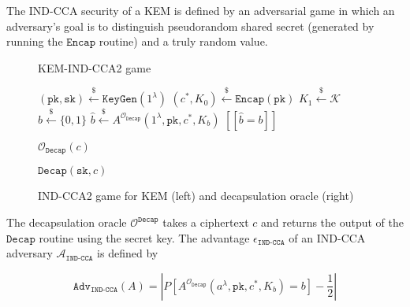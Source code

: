 \documentclass[journal=tches,submission]{iacrtrans}
\newcommand{\keygen}{\texttt{KeyGen}}
\newcommand{\encap}{\texttt{Encap}}
\newcommand{\decap}{\texttt{Decap}}
\newcommand{\pk}{\texttt{pk}}
\newcommand{\sk}{\texttt{sk}}
\newcommand{\leftsample}{\stackrel{\$}{\leftarrow}}
\newcommand{\llbrack}{[\![}
\newcommand{\rrbrack}{]\!]}
\newcommand{\norm}[1]{\left\lvert #1 \right\rvert}
\newcommand{\adv}{\texttt{Adv}}
\begin{document}
The IND-CCA security of a KEM is defined by an adversarial game in which an adversary's goal is to distinguish pseudorandom shared secret (generated by running the $\encap$ routine) and a truly random value.

\begin{figure}[H]
    \centering
    \begin{minipage}[b]{0.49\textwidth}
        \begin{algorithm}[H]
            \caption*{KEM-IND-CCA2 game}
            \begin{algorithmic}[1]
                \State $(\pk, \sk) \leftsample \keygen(1^\lambda)$
                \State $(c^\ast, K_0) \leftsample \encap(\pk)$
                \State $K_1 \leftsample \mathcal{K}$
                \State $b \leftsample \{0, 1\}$
                \State $\hat{b} \leftsample A^{\mathcal{O}_\decap}(
                    1^\lambda, \pk, c^\ast, K_b
                )$
                \State \Return $\llbrack \hat{b} = b \rrbrack$
            \end{algorithmic}
        \end{algorithm}
    \end{minipage}\hfill
    \begin{minipage}[b]{0.49\textwidth}
        \begin{algorithm}[H]
        \caption*{$\mathcal{O}_\decap(c)$}
        \begin{algorithmic}[1]
            \State \Return $\decap(\sk, c)$
        \end{algorithmic}
        \end{algorithm}
    \end{minipage}
    \caption{IND-CCA2 game for KEM (left) and decapsulation oracle (right)}\label{fig:kem-game}
\end{figure}


The decapsulation oracle $\mathcal{O}^\decap$ takes a ciphertext $c$ and returns the output of the $\decap$ routine using the secret key. The advantage $\epsilon_\texttt{IND-CCA}$ of an IND-CCA adversary $\mathcal{A}_\texttt{IND-CCA}$ is defined by

\begin{equation*}
    \adv_\texttt{IND-CCA}(A) = \norm{
        P[A^{\mathcal{O}_\decap}(a^\lambda, \pk, c^\ast, K_b) = b] - \frac{1}{2}
    }
\end{equation*}
\end{document}
